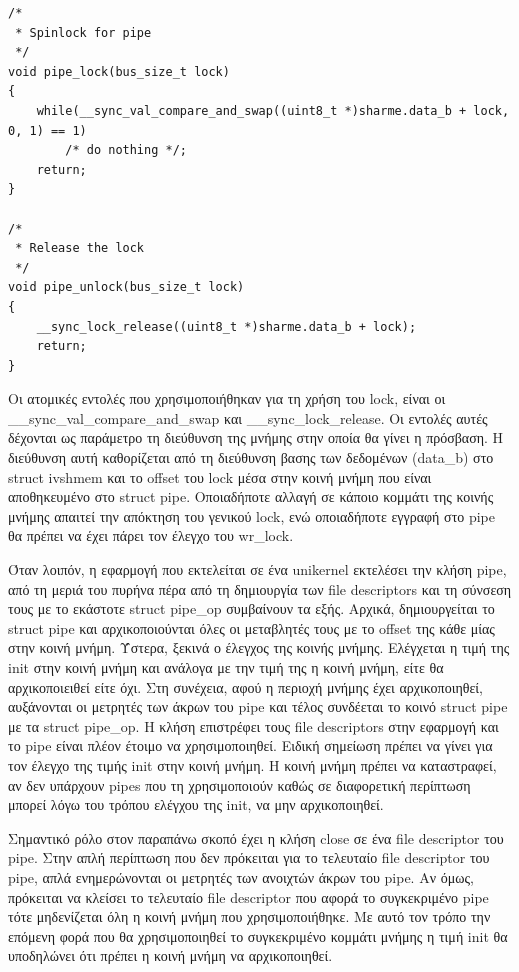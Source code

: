 \begin{lstlisting}
/*
 * Spinlock for pipe
 */
void pipe_lock(bus_size_t lock)
{
	while(__sync_val_compare_and_swap((uint8_t *)sharme.data_b + lock, 0, 1) == 1)
		/* do nothing */;
	return;
}

/*
 * Release the lock
 */
void pipe_unlock(bus_size_t lock)
{
	__sync_lock_release((uint8_t *)sharme.data_b + lock);
	return;
}

\end{lstlisting}

Οι ατομικές εντολές που χρησιμοποιήθηκαν για τη χρήση του lock, είναι οι
\_\_sync\_val\_compare\_and\_swap και \_\_sync\_lock\_release. Οι εντολές αυτές
δέχονται ως παράμετρο τη διεύθυνση της μνήμης στην οποία θα γίνει η πρόσβαση. Η
διεύθυνση αυτή καθορίζεται από τη διεύθυνση βασης των δεδομένων (data\_b) στο
struct ivshmem και το offset του lock μέσα στην κοινή μνήμη που είναι
αποθηκευμένο στο struct pipe. Οποιαδήποτε αλλαγή σε κάποιο κομμάτι της κοινής
μνήμης απαιτεί την απόκτηση του γενικού lock, ενώ οποιαδήποτε εγγραφή στο pipe
θα πρέπει να έχει πάρει τον έλεγχο του wr\_lock.

Όταν λοιπόν, η εφαρμογή που εκτελείται σε ένα unikernel εκτελέσει την κλήση
pipe, από τη μεριά του πυρήνα πέρα από τη δημιουργία των file descriptors και τη
σύνσεση τους με το εκάστοτε struct pipe\_op συμβαίνουν τα εξής. Αρχικά,
δημιουργείται το struct pipe και αρχικοποιούνται όλες οι μεταβλητές τους με το
offset της κάθε μίας στην κοινή μνήμη. Ύστερα, ξεκινά ο έλεγχος της κοινής
μνήμης. Ελέγχεται η τιμή της init στην κοινή μνήμη και ανάλογα με την τιμή της η
κοινή μνήμη, είτε θα αρχικοποιειθεί είτε όχι. Στη συνέχεια, αφού η περιοχή
μνήμης έχει αρχικοποιηθεί, αυξάνονται οι μετρητές των άκρων του pipe και τέλος
συνδέεται το κοινό struct pipe με τα struct pipe\_op. Η κλήση επιστρέφει τους
file descriptors στην εφαρμογή και το pipe είναι πλέον έτοιμο να
χρησιμοποιηθεί. Ειδική σημείωση πρέπει να γίνει για τον έλεγχο της τιμής init
στην κοινή μνήμη. Η κοινή μνήμη πρέπει να καταστραφεί, αν δεν υπάρχουν pipes που
τη χρησιμοποιούν καθώς σε διαφορετική περίπτωση μπορεί λόγω του τρόπου ελέγχου
της init, να μην αρχικοποιηθεί. 

Σημαντικό ρόλο στον παραπάνω σκοπό έχει η κλήση close σε ένα file descriptor του
pipe. Στην απλή περίπτωση που δεν πρόκειται για το τελευταίο file descriptor του
pipe, απλά ενημερώνονται οι μετρητές των ανοιχτών άκρων του pipe. Αν όμως,
πρόκειται να κλείσει το τελευταίο file descriptor που αφορά το συγκεκριμένο pipe
τότε μηδενίζεται όλη η κοινή μνήμη που χρησιμοποιήθηκε. Με αυτό τον τρόπο την
επόμενη φορά που θα χρησιμοποιηθεί το συγκεκριμένο κομμάτι μνήμης η τιμή init θα
υποδηλώνει ότι πρέπει η κοινή μνήμη να αρχικοποιηθεί. 

